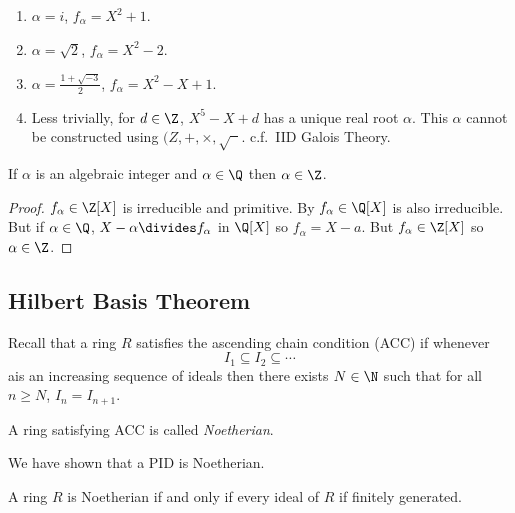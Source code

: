 \documentclass[a4paper]{article}
\theoremstyle{definition}
\begin{document}
\begin{eg}\leavevmode
  \begin{enumerate}
  \item \(\alpha = i\), \(f_\alpha = X^2 + 1\).
  \item \(\alpha = \sqrt 2\), \(f_\alpha = X^2 - 2\).
  \item \(\alpha = \frac{1 + \sqrt{-3}}{2}\), \(f_\alpha = X^2 - X + 1\).
  \item Less trivially, for \(d \in \Z\), \(X^5 - X + d\) has a unique real root \(\alpha\). This \(\alpha\) cannot be constructed using \((Z, +, \times, \sqrt{\phantom{x}}\). c.f.\ IID Galois Theory.
  \end{enumerate}
\end{eg}

\begin{lemma}
  If \(\alpha\) is an algebraic integer and \(\alpha \in \Q\) then \(\alpha \in \Z\).
\end{lemma}

\begin{proof}
  \(f_\alpha \in \Z[X]\) is irreducible and primitive. By  \(f_\alpha \in \Q[X]\) is also irreducible. But if \(\alpha \in \Q\), \(X - \alpha \divides f_\alpha\) in \(\Q[X]\) so \(f_\alpha = X - a\). But \(f_\alpha \in \Z[X]\) so \(\alpha \in \Z\).
\end{proof}

\subsection{Hilbert Basis Theorem}

Recall that a ring \(R\) satisfies the ascending chain condition (ACC) if whenever
\[
  I_1 \subseteq I_2 \subseteq \cdots
\]
ais an increasing sequence of ideals then there exists \(N \in \N\) such that for all \(n \geq N\), \(I_n = I_{n + 1}\).

A ring satisfying ACC is called \emph{Noetherian}.

We have shown that a PID is Noetherian.

\begin{lemma}
  A ring \(R\) is Noetherian if and only if every ideal of \(R\) if finitely generated.
\end{lemma}
\end{document}
